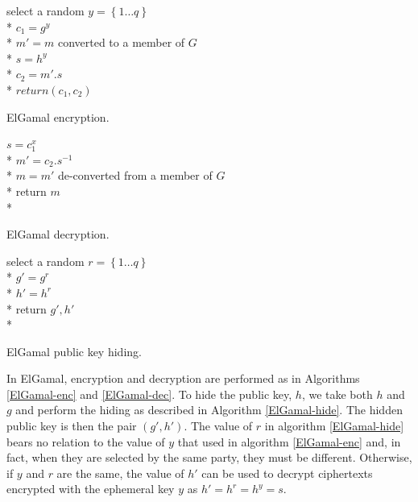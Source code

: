 \documentclass[ %
                    author={Luke Murray},
                supervisor={Dr. Simon Hollis},
                     title={Shadow Peer-to-Peer Networks},
                  subtitle={},
                    degree={MEng},
                      year={2013} ]{thesis}
\begin{document}
\begin{algorithm}[t]
    select a random $y = \left\{1 \ldots q\right\}$\\*
    $c_1 = g^{y}$\\*
    $m\prime = m$ converted to a member of $G$\\*
    $s = h^{y}$\\*
    $c_2 = m\prime.s$\\*
    $return (c_1, c_2)$
\caption{ElGamal encryption.}
\label{ElGamal-enc}
\end{algorithm}
\begin{algorithm}[t]
    $s = c_1^{x}$\\*
    $m\prime = c_2.s^{-1}$\\*
    $m = m\prime$ de-converted from a member of $G$\\*
    return $m$\\*
\caption{ElGamal decryption.}
\label{ElGamal-dec}
\end{algorithm}
\begin{algorithm}[t]
    select a random $r = \left\{1 \ldots q\right\}$\\*
    $g\prime = g^{r}$\\*
    $h\prime = h^{r}$\\*
    return $g\prime,h\prime$\\*
\caption{ElGamal public key hiding.}
\label{ElGamal-hide}
\end{algorithm}

In ElGamal, encryption and decryption are performed as in Algorithms \ref{ElGamal-enc} and \ref{ElGamal-dec}. To hide the public key, $h$, we take both $h$ and $g$ and perform the hiding as described in Algorithm \ref{ElGamal-hide}. The hidden public key is then the pair $(g\prime, h\prime)$. The value of $r$ in algorithm \ref{ElGamal-hide} bears no relation to the value of $y$ that used in algorithm \ref{ElGamal-enc} and, in fact, when they are selected by the same party, they must be different. Otherwise, if $y$ and $r$ are the same, the value of $h\prime$ can be used to decrypt ciphertexts encrypted with the ephemeral key $y$ as $h\prime = h^{r} = h^{y} = s$.
\end{document}
